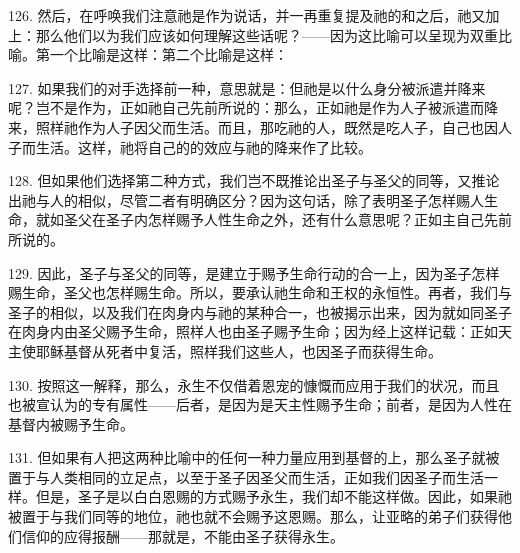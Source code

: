 126. 然后，在呼唤我们注意祂是作为说话，并一再重复提及祂的和之后，祂又加上：那么他们以为我们应该如何理解这些话呢？——因为这比喻可以呈现为双重比喻。第一个比喻是这样：第二个比喻是这样：\par

127. 如果我们的对手选择前一种，意思就是：但祂是以什么身分被派遣并降来呢？岂不是作为，正如祂自己先前所说的：那么，正如祂是作为人子被派遣而降来，照样祂作为人子因父而生活。而且，那吃祂的人，既然是吃人子，自己也因人子而生活。这样，祂将自己的的效应与祂的降来作了比较。\par

128. 但如果他们选择第二种方式，我们岂不既推论出圣子与圣父的同等，又推论出祂与人的相似，尽管二者有明确区分？因为这句话，除了表明圣子怎样赐人生命，就如圣父在圣子内怎样赐予人性生命之外，还有什么意思呢？正如主自己先前所说的。\par

129. 因此，圣子与圣父的同等，是建立于赐予生命行动的合一上，因为圣子怎样赐生命，圣父也怎样赐生命。所以，要承认祂生命和王权的永恒性。再者，我们与圣子的相似，以及我们在肉身内与祂的某种合一，也被揭示出来，因为就如同圣子在肉身内由圣父赐予生命，照样人也由圣子赐予生命；因为经上这样记载：正如天主使耶稣基督从死者中复活，照样我们这些人，也因圣子而获得生命。\par

130. 按照这一解释，那么，永生不仅借着恩宠的慷慨而应用于我们的状况，而且也被宣认为的专有属性——后者，是因为是天主性赐予生命；前者，是因为人性在基督内被赐予生命。\par

131. 但如果有人把这两种比喻中的任何一种力量应用到基督的上，那么圣子就被置于与人类相同的立足点，以至于圣子因圣父而生活，正如我们因圣子而生活一样。但是，圣子是以白白恩赐的方式赐予永生，我们却不能这样做。因此，如果祂被置于与我们同等的地位，祂也就不会赐予这恩赐。那么，让亚略的弟子们获得他们信仰的应得报酬——那就是，不能由圣子获得永生。\par

